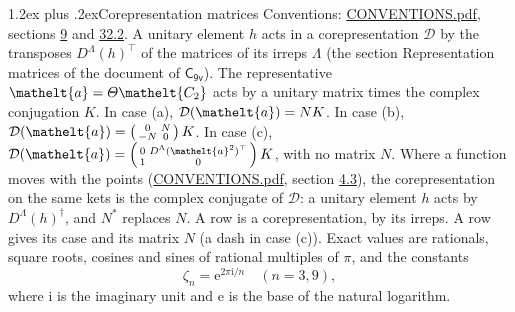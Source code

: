 \documentclass[10pt,a4paper]{article}
\makeatletter
\renewcommand\section{\@startsection{section}{1}{\z@}{-3ex plus -1ex minus -.2ex}%
  {1.2ex plus .2ex}{\normalfont\large\sffamily\bfseries\color{parttitle}}}
\numberwithin{equation}{section}
\newcommand{\eltfont}[1]{{\let\sigma\eltsigma\mathelt{#1}}}
\newcommand{\grp}[1]{\mathsf{#1}}
\newcommand{\elt}[1]{\eltfont{#1}}
\newcommand{\iunit}{\mathrm{i}}
\newcommand{\expe}{\mathrm{e}}
\newcommand{\rootunity}[1]{\zeta_{#1}}
\makeatother
\begin{document}
\section{Corepresentation matrices}\label{s:corep_matrices}
Conventions: \href{../../CONVENTIONS.pdf}{CONVENTIONS.pdf}, sections \href{../../../rotation/CONVENTIONS.pdf\#conv.9}{9} and \href{../../CONVENTIONS.pdf\#conv.32.2}{32.2}.
A unitary element $h$ acts in a corepresentation $\mathcal{D}$ by the transposes $D^{\Lambda}(h)^{\top}$ of the matrices of its irreps $\Lambda$ (the section Representation matrices of the document of \href{../../../rotation/data/pdf/C9v.pdf}{$\grp{C_{9v}}$}). The representative $\elt{a} = \varTheta\elt{C_{2}}$ acts by a unitary matrix times the complex conjugation $K$.
In case (a), $\mathcal{D}(\elt{a}) = NK$. In case (b), $\mathcal{D}(\elt{a}) = \left(\begin{smallmatrix} 0 & N \\ -N & 0 \end{smallmatrix}\right) K$. In case (c), $\mathcal{D}(\elt{a}) = \left(\begin{smallmatrix} 0 & D^{\Lambda}(\elt{a}^2)^{\top} \\ 1 & 0 \end{smallmatrix}\right) K$, with no matrix $N$.
Where a function moves with the points (\href{../../CONVENTIONS.pdf}{CONVENTIONS.pdf}, section \href{../../../rotation/CONVENTIONS.pdf\#conv.4.3}{4.3}), the corepresentation on the same kets is the complex conjugate of $\mathcal{D}$: a unitary element $h$ acts by $D^{\Lambda}(h)^{\dagger}$, and $N^{*}$ replaces $N$.
A row is a corepresentation, by its irreps. A row gives its case and its matrix $N$ (a dash in case (c)).
\leavevmode\label{n:constant.root}\label{n:index.root.order}Exact values are rationals, square roots, cosines and sines of rational multiples of $\pi$, and the constants
\begin{equation}\label{e:constants}\rootunity{n} = \expe^{2\pi\iunit/n}\quad(n = 3, 9),\end{equation}
where $\iunit$ is the imaginary unit and $\expe$ is the base of the natural logarithm.
\end{document}
